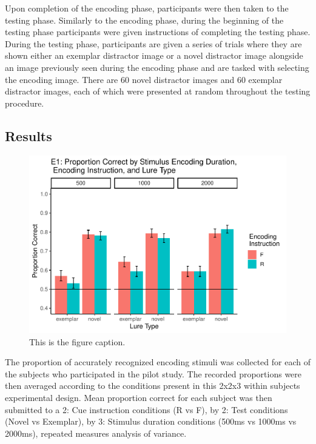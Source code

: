 \documentclass[
  english,
  man,floatsintext]{apa6}
\begin{document}
Upon completion of the encoding phase, participants were then taken to the testing phase. Similarly to the encoding phase, during the beginning of the testing phase participants were given instructions of completing the testing phase. During the testing phase, participants are given a series of trials where they are shown either an exemplar distractor image or a novel distractor image alongside an image previously seen during the encoding phase and are tasked with selecting the encoding image. There are 60 novel distractor images and 60 exemplar distractor images, each of which were presented at random throughout the testing procedure.

\hypertarget{results}{%
\subsection{Results}\label{results}}

\begin{figure}
\centering
\includegraphics{honorsThesis_files/figure-latex/e1fig-1.pdf}
\caption{\label{fig:e1fig}This is the figure caption.}
\end{figure}

The proportion of accurately recognized encoding stimuli was collected for each of the subjects who participated in the pilot study. The recorded proportions were then averaged according to the conditions present in this 2x2x3 within subjects experimental design. Mean proportion correct for each subject was then submitted to a 2: Cue instruction conditions (R vs F), by 2: Test conditions (Novel vs Exemplar), by 3: Stimulus duration conditions (500ms vs 1000ms vs 2000ms), repeated measures analysis of variance.
\end{document}
